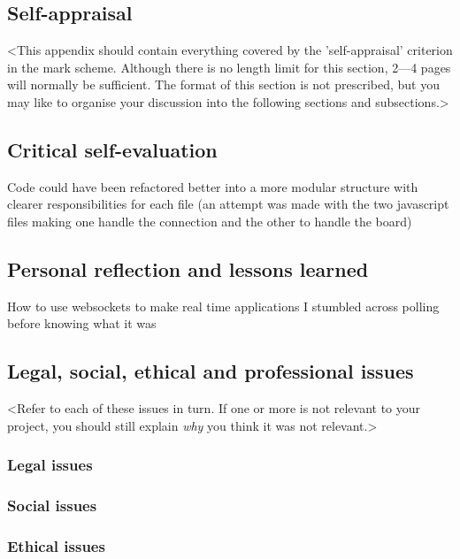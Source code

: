 \begin{appendices}

%
%
\chapter{Self-appraisal}

<This appendix should contain everything covered by the 'self-appraisal' criterion in the mark scheme. Although there is no length limit for this section, 2---4 pages will normally be sufficient. The format of this section is not prescribed, but you may like to organise your discussion into the following sections and subsections.>

\section{Critical self-evaluation}

Code could have been refactored better into a more modular structure with clearer responsibilities for each file (an attempt was made with the two javascript files making one handle the connection and the other to handle the board)

\section{Personal reflection and lessons learned}

How to use websockets to make real time applications
I stumbled across polling before knowing what it was

\section{Legal, social, ethical and professional issues}

<Refer to each of these issues in turn. If one or more is not relevant to your project, you should still explain {\em why} you think it was not relevant.>

\subsection{Legal issues}

\subsection{Social issues}

\subsection{Ethical issues}


\end{appendices}
